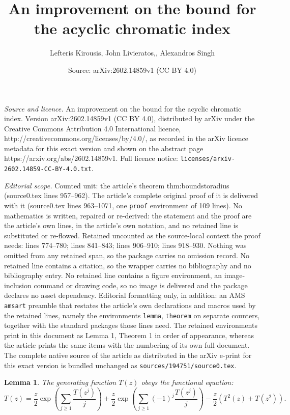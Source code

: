 \documentclass[10pt,a4paper]{amsart}
\title{An improvement on the bound for the acyclic chromatic index}
\author{Lefteris Kirousis, John Livieratos,, Alexandros Singh}
\date{Source: arXiv:2602.14859v1 (CC BY 4.0)}
\newtheorem{lemma}{Lemma}
\newcommand{\nicetrees}{T}
\begin{document}
\maketitle

\noindent\emph{Source and licence.} An improvement on the bound for the acyclic chromatic index. Version arXiv:2602.14859v1 (CC BY 4.0), distributed by arXiv under the Creative Commons Attribution 4.0 International licence, http://creativecommons.org/licenses/by/4.0/, as recorded in the arXiv licence metadata for this exact version and shown on the abstract page https://arxiv.org/abs/2602.14859v1. Full licence notice: \texttt{licenses/arxiv-2602.14859-CC-BY-4.0.txt}.\par\smallskip

\noindent\textit{Editorial scope.} Counted unit: the article's theorem thm:boundstoradius (source0.tex lines 957--962). The article's complete original proof of it is delivered with it (source0.tex lines 963--1071, one \texttt{proof} environment of 109 lines). No mathematics is written, repaired or re-derived: the statement and the proof are the article's own lines, in the article's own notation, and no retained line is substituted or re-flowed.  Retained uncounted as the source-local context the proof needs: lines 774--780; lines 841--843; lines 906--910; lines 918--930.  Nothing was omitted from any retained span, so the package carries no omission record.  No retained line contains a citation, so the wrapper carries no bibliography and no bibliography entry.  No retained line contains a figure environment, an image-inclusion command or drawing code, so no image is delivered and the package declares no asset dependency.  Editorial formatting only, in addition: an AMS \texttt{amsart} preamble that restates the article's own declarations and macros used by the retained lines, namely the environments \texttt{lemma}, \texttt{theorem} on separate counters, together with the standard packages those lines need.  The retained environments print in this document as Lemma 1, Theorem 1 in order of appearance, whereas the article prints the same items with the numbering of its own full document.  The complete native source of the article as distributed in the arXiv e-print for this exact version is bundled unchanged as \texttt{sources/194751/source0.tex}.
\begin{lemma}\label{lemma:spec1}
The generating function $\nicetrees(z)$ obeys the functional equation:
\begin{equation}\label{eq:spec}
 T(z) = \frac{z}{2} \exp\left(\sum\limits_{j \geq 1} \frac{\nicetrees(z^j)}{j}\right) + \frac{z}{2}\exp\left(\sum\limits_{j \geq 1} (-1)^j \frac{\nicetrees(z^j)}{j} \right)  
-\frac{z}{2}\left({T^2(z)} + {\nicetrees(z^2)} \right).
\end{equation}
\end{lemma}
\end{document}
